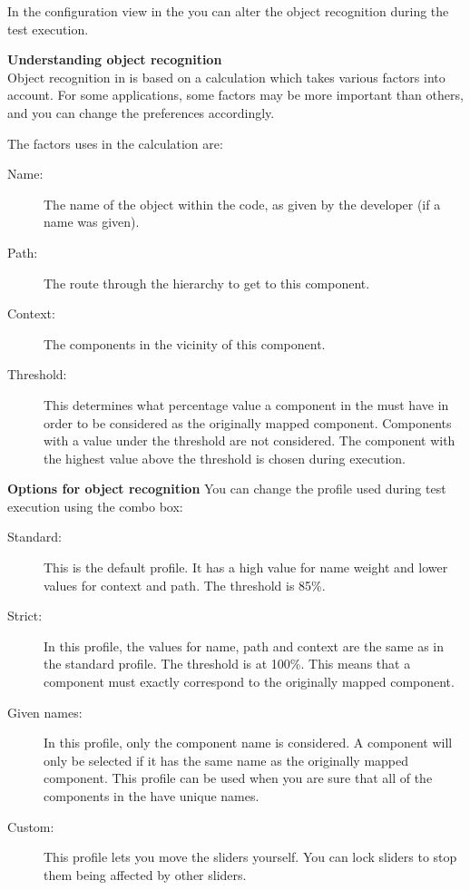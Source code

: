 \label{objectprefs}

In the configuration view in the \gdomeditor{} you can alter the object recognition during the test execution. 


\textbf{Understanding object recognition}\\
Object recognition in \jb{} is based on a calculation which takes various factors into account. For some applications, some factors may be more important than others, and you can change the preferences accordingly. 

The factors \jb{} uses in the calculation are:

\begin{description}
\item [Name:]{The name of the object within the \gdaut{} code, as given by the developer (if a name was given). }
\item [Path:]{The route through the \gdaut{} hierarchy to get to this component.}
\item [Context:]{The components in the vicinity of this component.}
\item[Threshold:]{This determines what percentage value a component in the \gdaut{} must have in order to be considered as the originally mapped component. Components with a value under the threshold are not considered. The component with the highest value above the threshold is chosen during execution.}
\end{description}

\textbf{Options for object recognition}
You can change the profile used during test execution using the combo box:

\begin{description}
\item[Standard:]{This is the default profile. It has a high value for name weight and lower values for context and path. The threshold is 85\%.}
\item[Strict:]{In this profile, the values for name, path and context are the same as in the standard profile. The threshold is at 100\%. This means that a component must exactly correspond to the originally mapped component.}
\item[Given names:]{In this profile, only the component name is considered. A component will only be selected if it has the same name as the originally mapped component. This profile can be used when you are sure that all of the components in the \gdaut{} have unique names.}
\item[Custom:]{This profile lets you move the sliders yourself. You can lock sliders to stop them being affected by other sliders.}
\end{description}

